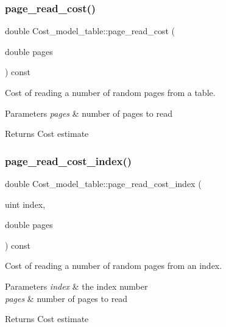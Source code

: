 \subsubsection{\texorpdfstring{page\+\_\+read\+\_\+cost()}{page\_read\_cost()}}
{\footnotesize\ttfamily double Cost\+\_\+model\+\_\+table\+::page\+\_\+read\+\_\+cost (\begin{DoxyParamCaption}\item[{double}]{pages }\end{DoxyParamCaption}) const}

Cost of reading a number of random pages from a table.


\begin{DoxyParams}{Parameters}
{\em pages} & number of pages to read\\
\hline
\end{DoxyParams}
\begin{DoxyReturn}{Returns}
Cost estimate 
\end{DoxyReturn}
\mbox{\label{classCost__model__table_a4732927c2aaa990219b7abeeb98f55aa}} 
\subsubsection{\texorpdfstring{page\+\_\+read\+\_\+cost\+\_\+index()}{page\_read\_cost\_index()}}
{\footnotesize\ttfamily double Cost\+\_\+model\+\_\+table\+::page\+\_\+read\+\_\+cost\+\_\+index (\begin{DoxyParamCaption}\item[{uint}]{index,  }\item[{double}]{pages }\end{DoxyParamCaption}) const}

Cost of reading a number of random pages from an index.


\begin{DoxyParams}{Parameters}
{\em index} & the index number \\
\hline
{\em pages} & number of pages to read\\
\hline
\end{DoxyParams}
\begin{DoxyReturn}{Returns}
Cost estimate 
\end{DoxyReturn}
\mbox{\label{classCost__model__table_a9c4bdc53d6fe77c76fa2c3e7acbb9b0c}} 
